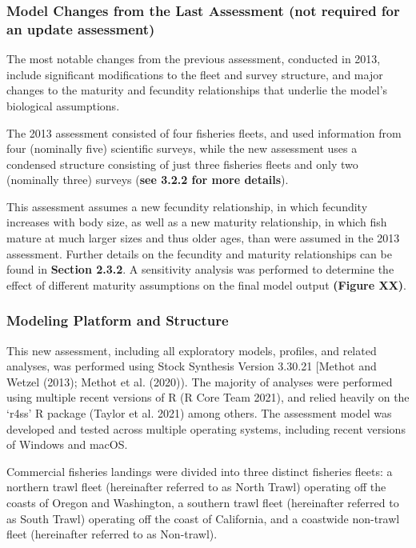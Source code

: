\documentclass[11pt,
  english,
  letterpaper,
]{article}
\begin{document}
\hypertarget{model-changes-from-the-last-assessment-not-required-for-an-update-assessment}{%
\subsubsection{Model Changes from the Last Assessment (not required for an update assessment)}\label{model-changes-from-the-last-assessment-not-required-for-an-update-assessment}}

The most notable changes from the previous assessment, conducted in 2013, include significant modifications to the fleet and survey structure, and major changes to the maturity and fecundity relationships that underlie the model's biological assumptions.

The 2013 assessment consisted of four fisheries fleets, and used information from four (nominally five) scientific surveys, while the new assessment uses a condensed structure consisting of just three fisheries fleets and only two (nominally three) surveys (\textbf{see 3.2.2 for more details}).

This assessment assumes a new fecundity relationship, in which fecundity increases with body size, as well as a new maturity relationship, in which fish mature at much larger sizes and thus older ages, than were assumed in the 2013 assessment. Further details on the fecundity and maturity relationships can be found in \textbf{Section 2.3.2}. A sensitivity analysis was performed to determine the effect of different maturity assumptions on the final model output \textbf{(Figure XX)}.

\hypertarget{modeling-platform-and-structure}{%
\subsubsection{Modeling Platform and Structure}\label{modeling-platform-and-structure}}

This new assessment, including all exploratory models, profiles, and related analyses, was performed using Stock Synthesis Version 3.30.21 {[}Methot and Wetzel (2013); Methot et al. (2020)). The majority of analyses were performed using multiple recent versions of R (R Core Team 2021), and relied heavily on the `r4ss' R package (Taylor et al. 2021) among others. The assessment model was developed and tested across multiple operating systems, including recent versions of Windows and macOS.

Commercial fisheries landings were divided into three distinct fisheries fleets: a northern trawl fleet (hereinafter referred to as North Trawl) operating off the coasts of Oregon and Washington, a southern trawl fleet (hereinafter referred to as South Trawl) operating off the coast of California, and a coastwide non-trawl fleet (hereinafter referred to as Non-trawl).
\end{document}
